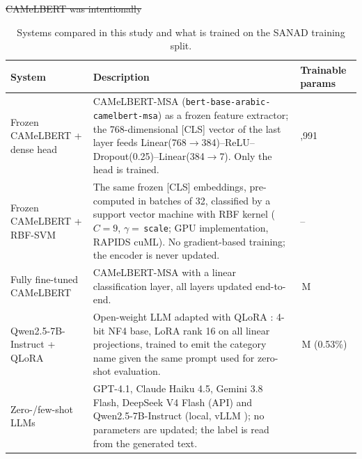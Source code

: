 \documentclass[preprint,12pt,authoryear]{elsarticle}
\providecommand{\DIFdel}[1]{{\protect\color{red}\sout{#1}}}                      %
\providecommand{\DIFaddbegin}{} %
\providecommand{\DIFdelend}{} %
\begin{document}
\DIFdel{CAMeLBERT was intentionally }\DIFdelend \DIFaddbegin \begin{table}[!ht]
\centering
\caption{Systems compared in this study and what is trained on the SANAD training split.}
\label{tab:models_summary}
\small
\begin{tabularx}{\textwidth}{@{}>{\raggedright\arraybackslash}p{3.0cm} >{\raggedright\arraybackslash}X >{\raggedleft\arraybackslash}p{1.7cm}@{}}
\toprule
\textbf{System} & \textbf{Description} & \textbf{Trainable params} \\
\midrule
Frozen CAMeLBERT + dense head & CAMeLBERT-MSA (\texttt{bert-base-arabic-\allowbreak camelbert-msa}) \cite{DBLP:journals/corr/abs-2103-06678} as a frozen feature extractor; the 768-dimensional [CLS] vector of the last layer feeds Linear(768$\to$384)--\allowbreak ReLU--\allowbreak Dropout(0.25)--\allowbreak Linear(384$\to$7). Only the head is trained. & 297,991 \\
Frozen CAMeLBERT + RBF-SVM & The same frozen [CLS] embeddings, pre-computed in batches of 32, classified by a support vector machine with RBF kernel ($C=9$, $\gamma=$\,\texttt{scale}; GPU implementation, RAPIDS cuML). No gradient-based training; the encoder is never updated. & -- \\
Fully fine-tuned CAMeLBERT & CAMeLBERT-MSA with a linear classification layer, all layers updated end-to-end. & 109.1\,M \\
Qwen2.5-7B-Instruct + QLoRA & Open-weight LLM \cite{qwen2025qwen25} adapted with QLoRA \cite{dettmers2023qlora,hu2022lora}: 4-bit NF4 base, LoRA rank 16 on all linear projections, trained to emit the category name given the same prompt used for zero-shot evaluation. & 40.4\,M (0.53\%) \\
Zero-/few-shot LLMs & GPT-4.1, Claude Haiku 4.5, Gemini 3.8 Flash, DeepSeek V4 Flash (API) and Qwen2.5-7B-Instruct (local, vLLM \cite{kwon2023vllm}); no parameters are updated; the label is read from the generated text. & 0 \\
\bottomrule
\end{tabularx}
\end{table}
\end{document}
